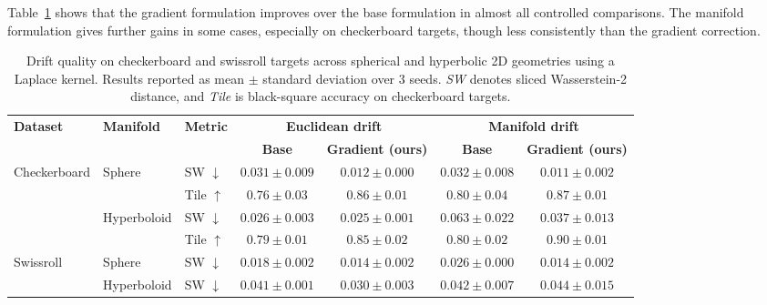 \documentclass{article}
\theoremstyle{plain}
\newcommand{\best}[1]{\cellcolor{bestblue}#1}
\newcommand{\second}[1]{\cellcolor{secondblue}#1}
\begin{document}
Table~\ref{tab:toy-table} shows that the gradient formulation improves over the base formulation in almost all controlled comparisons. The manifold formulation gives further gains in some cases, especially on checkerboard targets, though less consistently than the gradient correction.
\begin{table}[h!]
  \centering
  \small
  \setlength{\tabcolsep}{4pt}
  \renewcommand{\arraystretch}{1.12}
  \caption{Drift quality on checkerboard and swissroll targets across spherical and hyperbolic 2D geometries using a Laplace kernel. Results reported as mean $\pm$ standard deviation over 3 seeds. \textit{SW} denotes sliced Wasserstein-2 distance, and \textit{Tile} is black-square accuracy on checkerboard targets.}
  \begin{tabular}{@{}lllcccc@{}}
  \toprule
  \textbf{Dataset} & \textbf{Manifold} & \textbf{Metric} &
  \multicolumn{2}{c}{\textbf{Euclidean drift}} &
  \multicolumn{2}{c}{\textbf{Manifold drift}} \\
  \cmidrule(lr){4-5}\cmidrule(l){6-7}
  & & & \textbf{Base} & \textbf{Gradient (ours)} & \textbf{Base} & \textbf{Gradient (ours)} \\
  \midrule

  \multirow{4}{*}{Checkerboard}
    & \multirow{2}{*}{Sphere}
    & SW $\downarrow$
    & {$0.031 \pm 0.009$}
    & \second{$0.012 \pm 0.000$}
    & $0.032 \pm 0.008$
    & \best{$\mathbf{0.011 \pm 0.002}$} \\

    & 
    & Tile $\uparrow$
    & {$0.76 \pm 0.03$}
    & \second{$0.86 \pm 0.01$}
    & {$0.80 \pm 0.04$}
    & \best{$\mathbf{0.87 \pm 0.01}$} \\

  \addlinespace[2pt]

    & \multirow{2}{*}{Hyperboloid}
    & SW $\downarrow$
    & \second{$0.026 \pm 0.003$}
    & \best{$\mathbf{0.025 \pm 0.001}$}
    & $0.063 \pm 0.022$
    & {$0.037 \pm 0.013$} \\

    &
    & Tile $\uparrow$
    & $0.79 \pm 0.01$
    & \second{$0.85 \pm 0.02$}
    & {$0.80 \pm 0.02$}
    & \best{$\mathbf{0.90 \pm 0.01}$} \\

  \midrule

  \multirow{2}{*}{Swissroll}
    & Sphere
    & SW $\downarrow$
    & \second{$0.018 \pm 0.002$}
    & \best{$\mathbf{0.014 \pm 0.002}$}
    & {$0.026 \pm 0.000$}
    & \best{$\mathbf{0.014 \pm 0.002}$ }\\
    
    & Hyperboloid
    & SW $\downarrow$  
    & \second{$0.041 \pm 0.001$ }
    & \best{$\mathbf{0.030 \pm 0.003}$}
    & {$0.042 \pm 0.007$ }
    & $0.044 \pm 0.015$ \\

  \bottomrule
  \end{tabular}
  
  \label{tab:toy-table}
\end{table}
\end{document}
